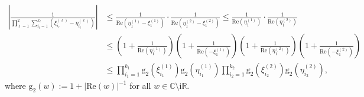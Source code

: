 \documentclass{article}
\numberwithin{equation}{section}
\newcommand{\complexC}{\mathbb{C}}
\newcommand{\realR}{\mathbb{R}}
\newcommand{\rg}{\mathrm{g}}
\begin{document}
\begin{equation}
	\label{eq:aux_14}
	\begin{split}
		\left|\frac{1}{\prod_{\ell=1}^2\sum_{i_\ell=1}^{k_\ell}(\xi_{i_\ell}^{(\ell)} -\eta_{i_\ell}^{(\ell)})}\right|&\le \frac{1}{\mathrm{Re}(\eta_{ 1}^{(1)}-\xi_{ 1}^{(1)})}\cdot \frac{1}{\mathrm{Re}(\eta_{1}^{(2)}-\xi_{1}^{(2)})}
		\le \frac{1}{\mathrm{Re}(\eta_1^{(1)})}\cdot \frac{1}{\mathrm{Re}(\eta_1^{(2)})}\\
		&\le  \left(1+\frac{1}{\mathrm{Re}(\eta_1^{(1)})}\right)\left(1+\frac{1}{\mathrm{Re}(-\xi_1^{(1)})}\right)\left(1+\frac{1}{\mathrm{Re}(\eta_1^{(2)})}\right)\left(1+\frac{1}{\mathrm{Re}(-\xi_1^{(2)})}\right)\\
		&\le \prod_{i_1=1}^{k_1}\rg_2\left(\xi_{i_1}^{(1)}\right)\rg_2\left(\eta_{i_1}^{(1)}\right)\prod_{i_2=1}^{k_2}\rg_2\left(\xi_{i_2}^{(2)}\right)\rg_2\left(\eta_{i_2}^{(2)}\right),
	\end{split}
\end{equation}
where $\rg_2(w):=1+|\mathrm{Re}(w)|^{-1}$ for all $w\in\complexC\setminus\mathrm{i}\realR$.
\end{document}
